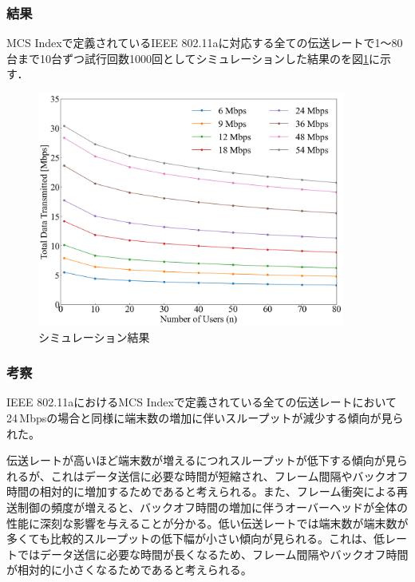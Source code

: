 \documentclass[a4paper,10pt]{ltjsarticle}
\begin{document}
\subsubsection{結果}
MCS Indexで定義されているIEEE 802.11aに対応する全ての伝送レートで1～80台まで10台ずつ試行回数1000回としてシミュレーションした結果のを図\ref{fig:simulation-result-mcs-index}に示す．


\begin{figure}[H]
  \centering
  \includegraphics[width=0.9\textwidth]{./assets/mcs_index.png}
  \caption{シミュレーション結果}
  \label{fig:simulation-result-mcs-index}
\end{figure}

\subsubsection{考察}


IEEE 802.11aにおけるMCS Indexで定義されている全ての伝送レートにおいて24\,Mbpsの場合と同様に端末数の増加に伴いスループットが減少する傾向が見られた。

伝送レートが高いほど端末数が増えるにつれスループットが低下する傾向が見られるが、これはデータ送信に必要な時間が短縮され、フレーム間隔やバックオフ時間の相対的に増加するためであると考えられる。また、フレーム衝突による再送制御の頻度が増えると、バックオフ時間の増加に伴うオーバーヘッドが全体の性能に深刻な影響を与えることが分かる。低い伝送レートでは端末数が端末数が多くても比較的スループットの低下幅が小さい傾向が見られる。これは、低レートではデータ送信に必要な時間が長くなるため、フレーム間隔やバックオフ時間が相対的に小さくなるためであると考えられる。
\end{document}

